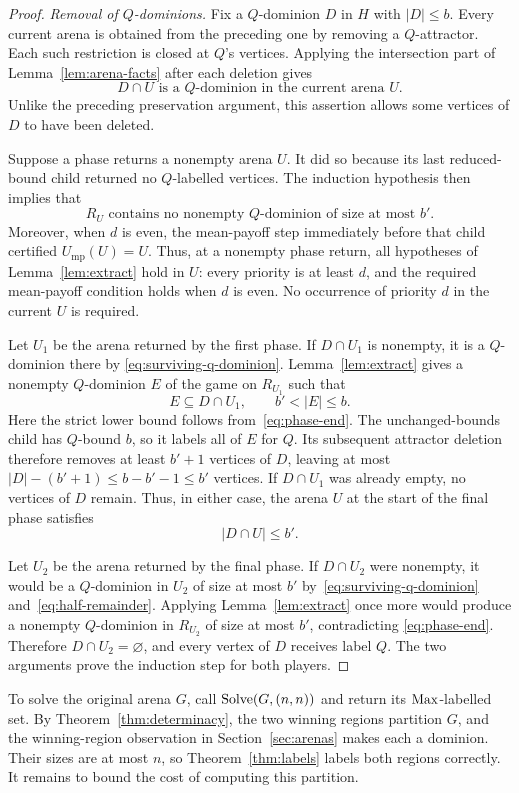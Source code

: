 \begin{proof}
\emph{Removal of $Q$-dominions.}
Fix a $Q$-dominion $D$ in $H$ with $|D|\le b$.  Every current arena is
obtained from the preceding one by removing a $Q$-attractor.  Each such
restriction is closed at $Q$'s vertices.  Applying the intersection
part of Lemma~\ref{lem:arena-facts} after each deletion gives
\begin{equation}
\label{eq:surviving-q-dominion}
 D\cap U\text{ is a $Q$-dominion in the current arena }U.
\end{equation}
Unlike the preceding preservation argument, this assertion allows some
vertices of $D$ to have been deleted.

Suppose a phase returns a nonempty arena $U$.  It did so because its
last reduced-bound child returned no $Q$-labelled vertices.  The
induction hypothesis then implies that
\begin{equation}
\label{eq:phase-end}
 R_U\text{ contains no nonempty $Q$-dominion of size at most }b'.
\end{equation}
Moreover, when $d$ is even, the mean-payoff step immediately before
that child certified $U_{\mathrm{mp}}(U)=U$.  Thus, at a nonempty phase
return, all hypotheses of Lemma~\ref{lem:extract} hold in $U$: every priority
is at least $d$, and the required mean-payoff condition holds when $d$
is even.  No occurrence of priority $d$ in the current $U$ is required.

Let $U_1$ be the arena returned by the first phase.  If $D\cap U_1$
is nonempty, it is a $Q$-dominion there by
\eqref{eq:surviving-q-dominion}.  Lemma~\ref{lem:extract} gives a
nonempty $Q$-dominion $E$ of the game on $R_{U_1}$ such that
\[
 E\subseteq D\cap U_1,\qquad b'<|E|\le b.
\]
Here the strict lower bound follows from~\eqref{eq:phase-end}.
The unchanged-bounds child has $Q$-bound $b$, so it labels all of $E$
for $Q$.  Its subsequent attractor deletion therefore removes at least
$b'+1$ vertices of $D$, leaving at most
$|D|-(b'+1)\le b-b'-1\le b'$ vertices.  If $D\cap U_1$ was
already empty, no vertices of $D$ remain.  Thus, in either case, the
arena $U$ at the start of the final phase satisfies
\begin{equation}
\label{eq:half-remainder}
 |D\cap U|\le b'.
\end{equation}

Let $U_2$ be the arena returned by the final phase.  If $D\cap U_2$
were nonempty, it would be a $Q$-dominion in $U_2$ of size at most $b'$
by~\eqref{eq:surviving-q-dominion} and~\eqref{eq:half-remainder}.
Applying Lemma~\ref{lem:extract} once more would produce a nonempty
$Q$-dominion in $R_{U_2}$ of size at most $b'$, contradicting
\eqref{eq:phase-end}.  Therefore $D\cap U_2=\varnothing$, and every
vertex of $D$ receives label $Q$.  The two arguments prove the
induction step for both players.
\end{proof}

To solve the original arena $G$, call $\operatorname{Solve}(G,(n,n))$ and return its
$\mathrm{Max}$-labelled set.  By Theorem~\ref{thm:determinacy}, the two winning
regions partition $G$, and the winning-region observation in
Section~\ref{sec:arenas} makes each a dominion.  Their sizes are at most
$n$, so Theorem~\ref{thm:labels} labels both regions correctly.  It remains to
bound the cost of computing this partition.
